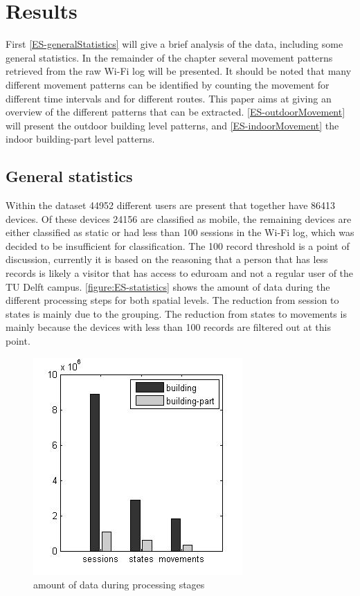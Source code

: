 \section{Results}\label{3-results}
First \autoref{ES-generalStatistics} will give a brief analysis of the data, including some general statistics. In the remainder of the chapter several movement patterns retrieved from the raw Wi-Fi log will be presented. It should be noted that many different movement patterns can be identified by counting the movement for different time intervals and for different routes. This paper aims at giving an overview of the different patterns that can be extracted. \autoref{ES-outdoorMovement} will present the outdoor building level patterns, and \autoref{ES-indoorMovement} the indoor building-part level patterns.

\subsection{General statistics}\label{ES-generalStatistics}
Within the dataset 44952 different users are present that together have 86413 devices. Of these devices 24156 are classified as mobile, the remaining devices are either classified as static or had less than 100 sessions in the Wi-Fi log, which was decided to be insufficient for classification. The 100 record threshold is a point of discussion, currently it is based on the reasoning that a person that has less records is likely a visitor that has access to eduroam and not a regular user of the TU Delft campus. \autoref{figure:ES-statistics} shows the amount of data during the different processing steps for both spatial levels. The reduction from session to states is mainly due to the grouping. The reduction from states to movements is mainly because the devices with less than 100 records are filtered out at this point.

\begin{figure}[H]
\centering
\includegraphics[scale=0.5]{ES-statistics.jpg}
\captionsetup{justification=centering}
\caption{amount of data during processing stages}
\label{figure:ES-statistics}
\end{figure}

